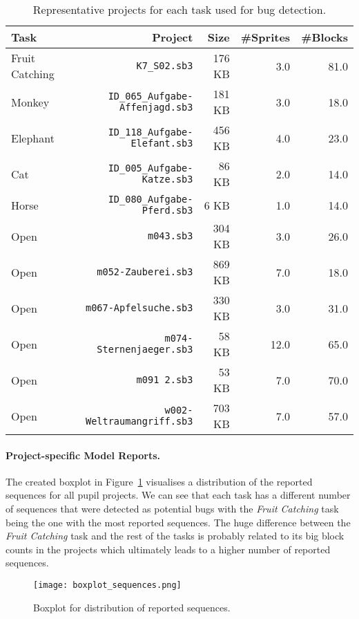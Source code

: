 \begin{table}[hbtp]
    \centering
    \caption[Representative projects of each task for bug detection]{\label{tab:buggy-projects}Representative projects for each task used for bug detection.}
    \begin{tabular}{lrrrr}
        \toprule
        Task & Project & Size & \#Sprites & \#Blocks\\
        \midrule
        Fruit Catching & \texttt{K7\_S02.sb3} & 176 KB & 3.0 & 81.0\\
        Monkey & \texttt{ID\_065\_Aufgabe-Affenjagd.sb3} & 181 KB & 3.0 & 18.0 \\
        Elephant & \texttt{ID\_118\_Aufgabe-Elefant.sb3} & 456 KB & 4.0 & 23.0 \\
        Cat & \texttt{ID\_005\_Aufgabe-Katze.sb3} & 86 KB & 2.0 & 14.0 \\
        Horse & \texttt{ID\_080\_Aufgabe-Pferd.sb3} & 6 KB & 1.0 & 14.0 \\
        Open & \texttt{m043.sb3} & 304 KB & 3.0 & 26.0 \\ 
        Open & \texttt{m052-Zauberei.sb3} & 869 KB & 7.0 & 18.0 \\
        Open & \texttt{m067-Apfelsuche.sb3} & 330 KB & 3.0 & 31.0 \\
        Open & \texttt{m074-Sternenjaeger.sb3} & 58 KB & 12.0 &  65.0 \\
        Open & \texttt{m091 2.sb3} & 53 KB & 7.0 & 70.0 \\
        Open & \texttt{w002-Weltraumangriff.sb3} & 703 KB & 7.0 & 57.0 \\
        \bottomrule
    \end{tabular}
\end{table}

\paragraph{Project-specific Model Reports.}
The created boxplot in Figure~\ref{fig:boxplot1} visualises a distribution of the reported sequences for all pupil projects. We can see that each task has a different number of sequences that were detected as potential bugs with the \textit{Fruit Catching} task being the one with the most reported sequences. The huge difference between the \textit{Fruit Catching} task and the rest of the tasks is probably related to its big block counts in the projects which ultimately leads to a higher number of reported sequences.

\begin{figure}[hbtp]
    \centering
    \texttt{[image: boxplot\_sequences.png]}
    \caption[Boxplot for distribution of reported sequences]{\label{fig:boxplot1}Boxplot for distribution of reported sequences.}
\end{figure}

